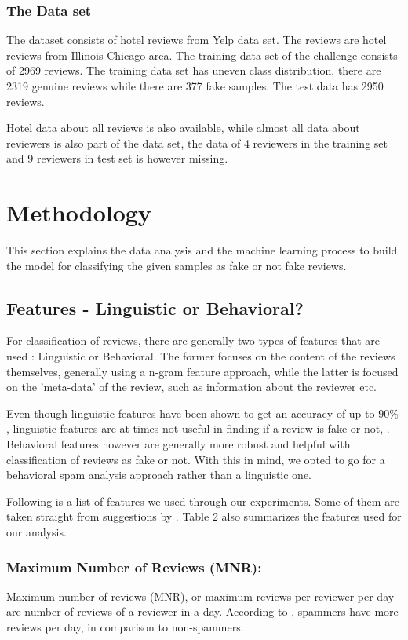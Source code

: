 \documentclass{llncs}
\begin{document}
\subsubsection{The Data set}
The dataset consists of hotel reviews from Yelp data set. The reviews are hotel reviews from Illinois Chicago area. The training data set of the challenge consists of 2969 reviews. The training data set has uneven class distribution, there are 2319 genuine reviews while there are 377 fake samples. The test data has 2950 reviews.

Hotel data about all reviews is also available, while almost all data about reviewers is also part of the data set, the data of 4 reviewers in the training set and 9 reviewers in test set is however missing.

\section{Methodology}
This section explains the data analysis and the machine learning process to build the model for classifying the given samples as fake  or not fake reviews. 
\subsection{Features - Linguistic or Behavioral?}
For classification of reviews, there are generally two types of features that are used \cite{arjun:et}: Linguistic or Behavioral. The former focuses on the content of the reviews themselves, generally using a n-gram feature approach, while the latter is focused on the 'meta-data' of the review, such as information about the reviewer etc. 

Even though linguistic features have been shown to get an accuracy of up to 90\% \cite{ott2011finding}, linguistic features are at times not useful in finding if a review is fake or not,  \cite{arjun:et}. Behavioral features however are generally more robust and helpful with classification of reviews as fake or not. With this in mind, we opted to go for a behavioral spam analysis approach rather than a linguistic one. 

Following is a list of features we used through our experiments. Some of them are taken straight from suggestions by \cite{arjun:et}. Table 2 also summarizes the features used for our analysis.
%
\subsubsection{Maximum Number of Reviews (MNR):}
%
Maximum number of reviews (MNR), or maximum reviews per reviewer per day are number of reviews of a reviewer in a day. According to \cite{arjun:et} , spammers have more reviews per day, in comparison to non-spammers. 
%
\end{document}
